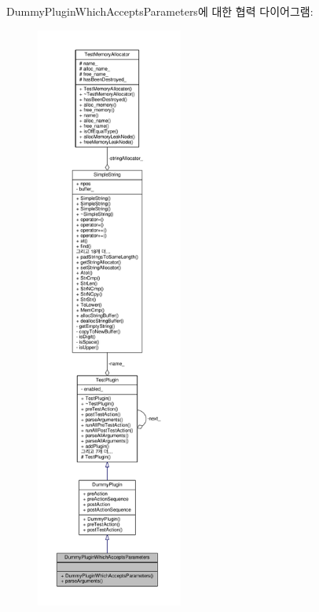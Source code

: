 Dummy\+Plugin\+Which\+Accepts\+Parameters에 대한 협력 다이어그램\+:
\nopagebreak
\begin{figure}[H]
\begin{center}
\leavevmode
\includegraphics[height=550pt]{class_dummy_plugin_which_accepts_parameters__coll__graph}
\end{center}
\end{figure}
